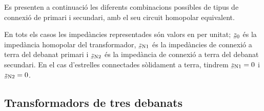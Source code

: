 Es presenten a continuació les diferents combinacions possibles de tipus de connexió de primari i secundari, amb el seu circuit homopolar equivalent.

En tots els casos les impedàncies representades són valors en per unitat; $\cmplx{z}_0$ és la impedància homopolar del transformador, $\cmplx{z}\ped{N1}$ és la impedàncies de connexió a terra del debanat primari i $\cmplx{z}\ped{N2}$ és  la impedància de connexió a terra del debanat secundari. En el cas d'estrelles connectades sòlidament a terra, tindrem $\cmplx{z}\ped{N1}=0$ i $\cmplx{z}\ped{N2}=0$.

\begin{center}
    
\end{center}

\begin{center}
    
\end{center}

\begin{center}
    
\end{center}

\begin{center}
    
\end{center}

\begin{center}
    
\end{center}

\begin{center}
    
\end{center}




\subsection{Transformadors de tres debanats}\label{sec:cir-hom-3-deb}

